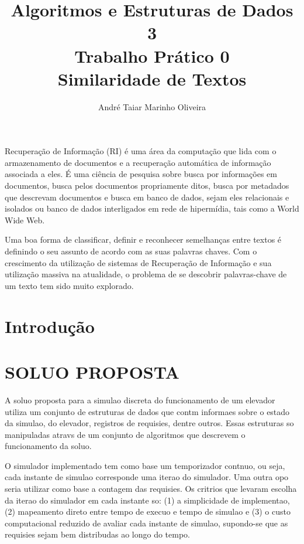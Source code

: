 \documentclass[12pt]{article}
\title{Algoritmos e Estruturas de Dados 3 \\ Trabalho Prático 0 \\
\huge{Similaridade de Textos}}
\author{André Taiar Marinho Oliveira}
\begin{document}
\maketitle

\begin{resumo}
Recuperação de Informação (RI) é uma área da computação  que lida com o armazenamento de documentos 
e a recuperação automática de informação associada a eles. É uma ciência de pesquisa sobre busca 
por informações em documentos, busca pelos documentos propriamente ditos, busca por metadados que 
descrevam documentos e busca em banco de dados, sejam eles relacionais e isolados ou banco de 
dados interligados em rede de hipermídia, tais como a World Wide Web.

Uma boa forma de classificar, definir e reconhecer semelhanças entre textos é definindo o
seu assunto de acordo com as suas palavras chaves. Com o crescimento da
utilização de sistemas de Recuperação de Informação e sua utilização massiva na
atualidade, o problema de se descobrir palavras-chave de um texto tem sido muito
explorado.
\end{resumo}

\section{Introdução}


\section{SOLUO PROPOSTA}
\label{solucao_proposta}

A soluo proposta para a simulao discreta do funcionamento de um elevador utiliza um conjunto de estruturas de dados que contm informaes sobre o estado da simulao, do elevador, registros de requisies, dentre outros. Essas estruturas so manipuladas atravs de um conjunto de algoritmos que descrevem o funcionamento da soluo.

O simulador implementado tem como base um temporizador contnuo, ou seja, cada instante de simulao corresponde  uma iterao do simulador. Uma outra opo seria utilizar como base a contagem das requisies. Os critrios que levaram  escolha da iterao do simulador em cada instante so: (1) a simplicidade de implementao, (2) mapeamento direto entre tempo de execuo e tempo de simulao e (3) o custo computacional reduzido de avaliar cada instante de simulao, supondo-se que as requisies sejam bem distribudas ao longo do tempo.
\end{document}
